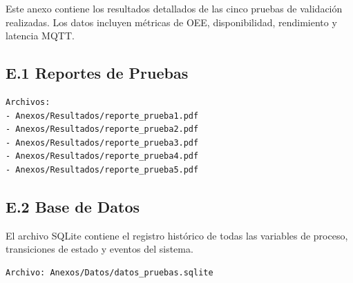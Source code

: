 Este anexo contiene los resultados detallados de las cinco pruebas de validación realizadas. Los datos incluyen métricas de OEE, disponibilidad, rendimiento y latencia MQTT.

\subsection*{E.1 Reportes de Pruebas}

\begin{verbatim}
Archivos:
- Anexos/Resultados/reporte_prueba1.pdf
- Anexos/Resultados/reporte_prueba2.pdf
- Anexos/Resultados/reporte_prueba3.pdf
- Anexos/Resultados/reporte_prueba4.pdf
- Anexos/Resultados/reporte_prueba5.pdf
\end{verbatim}

\subsection*{E.2 Base de Datos}

El archivo SQLite contiene el registro histórico de todas las variables de proceso, transiciones de estado y eventos del sistema.

\begin{verbatim}
Archivo: Anexos/Datos/datos_pruebas.sqlite
\end{verbatim}
